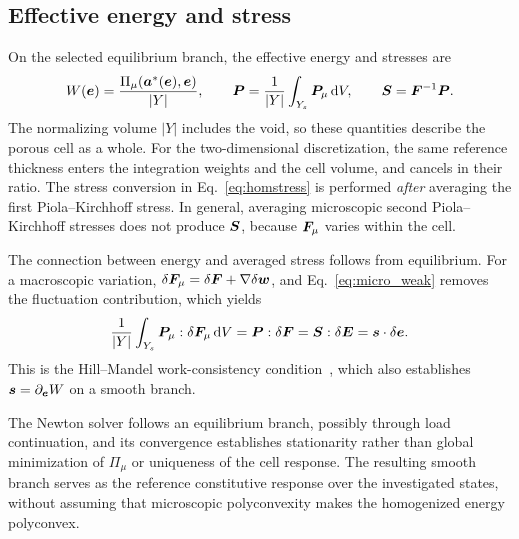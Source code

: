 \subsection{Effective energy and stress}
On the selected equilibrium branch, the effective energy and stresses are
\begin{equation}
 W(\bm e)=\frac{\Pi_\mu(\bm a^*(\bm e),\bm e)}{|Y|},\qquad
 \bm P=\frac{1}{|Y|}\int_{Y_s}\bm P_\mu\,\mathrm d V,
 \qquad \bm S=\bm F^{-1}\bm P.
 \label{eq:homstress}
\end{equation}
The normalizing volume $|Y|$ includes the void, so these quantities describe the porous cell as a whole. For the two-dimensional discretization, the same reference thickness enters the integration weights and the cell volume, and cancels in their ratio. The stress conversion in Eq.~\eqref{eq:homstress} is performed \emph{after} averaging the first Piola--Kirchhoff stress. In general, averaging microscopic second Piola--Kirchhoff stresses does not produce $\bm S$, because $\bm F_\mu$ varies within the cell.

The connection between energy and averaged stress follows from equilibrium. For a macroscopic variation, $\delta\bm F_\mu=\delta\bm F+\nabla\delta\bm w$, and Eq.~\eqref{eq:micro_weak} removes the fluctuation contribution, which yields
\begin{equation}
 \frac1{|Y|}\int_{Y_s}\bm P_\mu:\delta\bm F_\mu\,\mathrm d V
     =\bm P:\delta\bm F
     =\bm S:\delta\bm E
     =\bm s\cdot\delta\bm e.
 \label{eq:hill_mandel}
\end{equation}
This is the Hill--Mandel work-consistency condition~\cite{Miehe1999}, which also establishes $\bm s=\partial_{\bm e}W$ on a smooth branch.

The Newton solver follows an equilibrium branch, possibly through load continuation, and its convergence establishes stationarity rather than global minimization of $\Pi_\mu$ or uniqueness of the cell response. The resulting smooth branch serves as the reference constitutive response over the investigated states, without assuming that microscopic polyconvexity makes the homogenized energy polyconvex.

